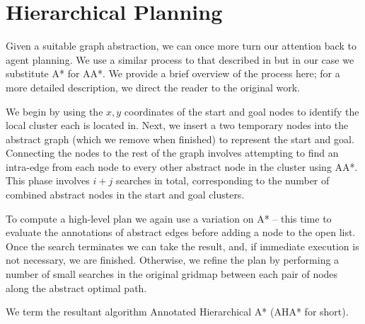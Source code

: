 \section{Hierarchical Planning}
Given a suitable graph abstraction, we can once more turn our attention back to agent planning. 
We use a similar process to that described in \cite{botea04} but in our case we substitute A* for AA*.
We provide a brief overview of the process here; for a more detailed description, we direct the reader to the original work.
\par \indent
We begin by using the $x,y$ coordinates of the start and goal  nodes to identify the local cluster each is located in. 
Next, we insert a two temporary nodes into the abstract graph (which we remove when finished) to represent the start and goal.
Connecting the nodes to the rest of the graph involves attempting to find an intra-edge from each node to every other abstract node in the cluster using AA*. 
This phase involves $i+j$ searches in total, corresponding to the number of combined abstract nodes in the start and goal clusters.
\par \indent
To compute a high-level plan we again use a variation on A* -- this time to evaluate the annotations of abstract edges before adding a node to the open list.
Once the search terminates we can take the result, and, if immediate execution is not necessary, we are finished. 
Otherwise, we refine the plan by performing a number of small searches in the original gridmap between each pair of nodes along the abstract optimal path. 
\par \indent
We term the resultant algorithm Annotated Hierarchical A* (AHA* for short).
